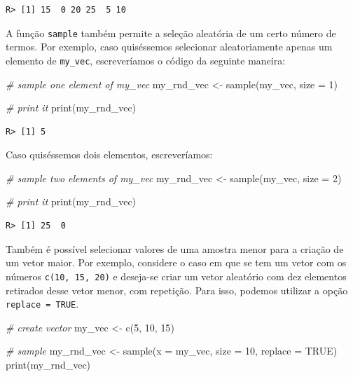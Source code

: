 \documentclass[
  11pt,
]{book}
\newenvironment{Shaded}{\begin{snugshade}}{\end{snugshade}}
\newcommand{\AttributeTok}[1]{\textcolor[rgb]{0.61,0.61,0.61}{#1}}
\newcommand{\CommentTok}[1]{\textcolor[rgb]{0.37,0.37,0.37}{\textit{#1}}}
\newcommand{\ConstantTok}[1]{\textcolor[rgb]{0,0,0}{#1}}
\newcommand{\DecValTok}[1]{\textcolor[rgb]{0.06,0.06,0.06}{#1}}
\newcommand{\FunctionTok}[1]{\textcolor[rgb]{0,0,0}{#1}}
\newcommand{\NormalTok}[1]{#1}
\newcommand{\OtherTok}[1]{\textcolor[rgb]{0.37,0.37,0.37}{#1}}
\begin{document}
\begin{verbatim}
R> [1] 15  0 20 25  5 10
\end{verbatim}

A função \texttt{sample} também permite a seleção aleatória de um certo número de termos. Por exemplo, caso quiséssemos selecionar aleatoriamente apenas um elemento de \texttt{my\_vec}, escreveríamos o código da seguinte maneira:

\begin{Shaded}
\begin{Highlighting}[]
\CommentTok{\# sample one element of my\_vec}
\NormalTok{my\_rnd\_vec }\OtherTok{\textless{}{-}} \FunctionTok{sample}\NormalTok{(my\_vec, }\AttributeTok{size =} \DecValTok{1}\NormalTok{)}

\CommentTok{\# print it}
\FunctionTok{print}\NormalTok{(my\_rnd\_vec)}
\end{Highlighting}
\end{Shaded}

\begin{verbatim}
R> [1] 5
\end{verbatim}

Caso quiséssemos dois elementos, escreveríamos:

\begin{Shaded}
\begin{Highlighting}[]
\CommentTok{\# sample two elements of my\_vec}
\NormalTok{my\_rnd\_vec }\OtherTok{\textless{}{-}} \FunctionTok{sample}\NormalTok{(my\_vec, }\AttributeTok{size =} \DecValTok{2}\NormalTok{)}

\CommentTok{\# print it}
\FunctionTok{print}\NormalTok{(my\_rnd\_vec)}
\end{Highlighting}
\end{Shaded}

\begin{verbatim}
R> [1] 25  0
\end{verbatim}

Também é possível selecionar valores de uma amostra menor para a criação de um vetor maior. Por exemplo, considere o caso em que se tem um vetor com os números \texttt{c(10,\ 15,\ 20)} e deseja-se criar um vetor aleatório com dez elementos retirados desse vetor menor, com repetição. Para isso, podemos utilizar a opção \texttt{replace\ =\ TRUE}.

\begin{Shaded}
\begin{Highlighting}[]
\CommentTok{\# create vector}
\NormalTok{my\_vec }\OtherTok{\textless{}{-}} \FunctionTok{c}\NormalTok{(}\DecValTok{5}\NormalTok{, }\DecValTok{10}\NormalTok{, }\DecValTok{15}\NormalTok{)}

\CommentTok{\# sample}
\NormalTok{my\_rnd\_vec }\OtherTok{\textless{}{-}} \FunctionTok{sample}\NormalTok{(}\AttributeTok{x =}\NormalTok{ my\_vec, }\AttributeTok{size =} \DecValTok{10}\NormalTok{, }\AttributeTok{replace =} \ConstantTok{TRUE}\NormalTok{)}
\FunctionTok{print}\NormalTok{(my\_rnd\_vec)}
\end{Highlighting}
\end{Shaded}
\end{document}
